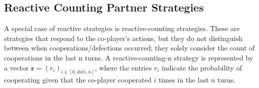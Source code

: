 \documentclass{article}
\theoremstyle{definition}
\begin{document}





\subsection{Reactive Counting Partner Strategies}

A special case of reactive strategies is reactive-counting strategies. These are
strategies that respond to the co-player's actions, but they do not distinguish
between when cooperations/defections occurred; they solely consider the count of
cooperations in the last n turns. A reactive-counting-n strategy is represented
by a vector $\mathbf{r}=(r_i)_{i \in [0, dots, n]}$, where the entries \(r_i\)
indicate the probability of cooperating given that the co-player cooperated
\(i\) times in the last \(n\) turns.
\end{document}
